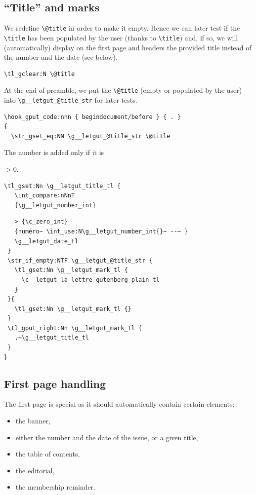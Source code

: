 \documentclass{letgut}
\begin{document}
\subsection{“Title” and marks}
\label{ImplementationTitleandmarks-5ylg55h0jlj0}
We redefine \lstinline+\@title+ in order to make it empty. Hence we can later test if
the \lstinline+\title+ has been populated by the user (thanks to \lstinline+\title+) and, if so,
we will (automatically) display on the first page and headers the provided
title instead of the number and the date (see below).
\begin{lstlisting}
\tl_gclear:N \@title
\end{lstlisting}

At the end of preamble, we put the \lstinline+\@title+ (empty or populated by the
user) into \lstinline+\g__letgut_@title_str+ for later tests.
\begin{lstlisting}
\hook_gput_code:nnn { begindocument/before } { . }
{
  \str_gset_eq:NN \g__letgut_@title_str \@title
\end{lstlisting}

The number is added only if it is

\(>0\).

\begin{lstlisting}
\tl_gset:Nn \g__letgut_title_tl {
   \int_compare:nNnT
   {\g__letgut_number_int}
\end{lstlisting}

\begin{lstlisting}
   > {\c_zero_int}
   {numéro~ \int_use:N\g__letgut_number_int{}~ --~ }
   \g__letgut_date_tl
 }
 \str_if_empty:NTF \g__letgut_@title_str {
   \tl_gset:Nn \g__letgut_mark_tl {
     \c__letgut_la_lettre_gutenberg_plain_tl
   }
 }{
   \tl_gset:Nn \g__letgut_mark_tl {}
 }
 \tl_gput_right:Nn \g__letgut_mark_tl {
   ,~\g__letgut_title_tl
 }
}
\end{lstlisting}
\subsection{First page handling}
\label{ImplementationFirstpagehandling-nmmg55h0jlj0}
The first page is special as it should automatically contain certain elements:
\begin{itemize}
\item the banner,
\item either the number and the date of the issue, or a given title,
\item the table of contents,
\item the editorial,
\item the membership reminder.
\end{itemize}
\end{document}
